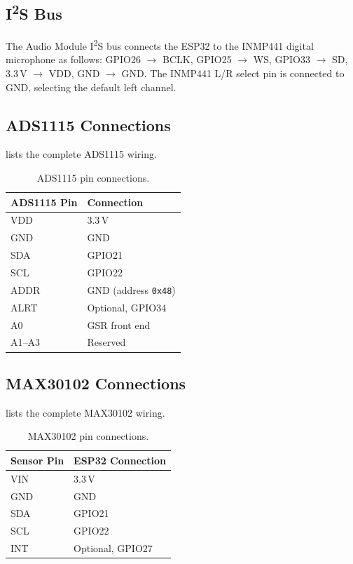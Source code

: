 \subsection{I\texorpdfstring{\textsuperscript{2}}{2}S Bus}
\label{sec:i2s-bus-ch5}

The Audio Module I\textsuperscript{2}S bus connects the ESP32 to the INMP441 digital microphone as follows: GPIO26 $\rightarrow$ BCLK, GPIO25 $\rightarrow$ WS, GPIO33 $\rightarrow$ SD, 3.3\,V $\rightarrow$ VDD, GND $\rightarrow$ GND. The INMP441 L/R select pin is connected to GND, selecting the default left channel.

\subsection{ADS1115 Connections}
\label{sec:ads1115-connections}

 lists the complete ADS1115 wiring.

\begin{table}[H]
\centering
\caption{ADS1115 pin connections.}
\label{tab:ads1115-wiring}
\small
\begin{tabularx}{\columnwidth}{@{}l Y@{}}
\toprule
\textbf{ADS1115 Pin} & \textbf{Connection} \\
\midrule
VDD & 3.3\,V \\
GND & GND \\
SDA & GPIO21 \\
SCL & GPIO22 \\
ADDR & GND (address \texttt{0x48}) \\
ALRT & Optional, GPIO34 \\
A0 & GSR front end \\
A1--A3 & Reserved \\
\bottomrule
\end{tabularx}
\end{table}

\subsection{MAX30102 Connections}
\label{sec:max30102-connections}

 lists the complete MAX30102 wiring.

\begin{table}[H]
\centering
\caption{MAX30102 pin connections.}
\label{tab:max30102-wiring}
\small
\begin{tabularx}{\columnwidth}{@{}l Y@{}}
\toprule
\textbf{Sensor Pin} & \textbf{ESP32 Connection} \\
\midrule
VIN & 3.3\,V \\
GND & GND \\
SDA & GPIO21 \\
SCL & GPIO22 \\
INT & Optional, GPIO27 \\
\bottomrule
\end{tabularx}
\end{table}

